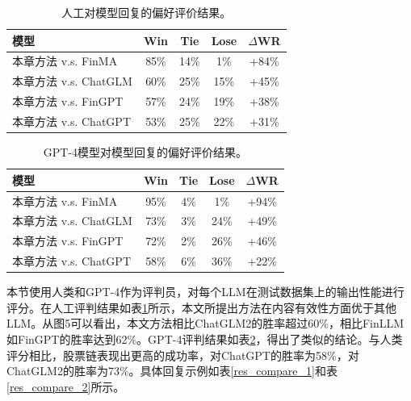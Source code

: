 \begin{table}
	\caption{\label{human_pk_table}人工对模型回复的偏好评价结果。}
	\centering{}%
	\small 
	\begin{tabular}{lcccc}
		\toprule[2pt]
		模型 & Win & Tie & Lose & $\Delta$WR \\
		\hline
		本章方法 v.s. FinMA & 85\% & 14\% & 1\% & +84\% \\
		本章方法 v.s. ChatGLM & 60\% & 25\% & 15\% & +45\% \\
		本章方法 v.s. FinGPT & 57\% & 24\% & 19\% & +38\% \\
		本章方法 v.s. ChatGPT & 53\% & 25\% & 22\% & +31\% \\
		\bottomrule[2pt]
	\end{tabular}
\end{table}

\begin{table}
	\caption{\label{gpt_pk_table}GPT-4模型对模型回复的偏好评价结果。}
	\centering{}%
	\small 
	\begin{tabular}{lcccc}
		\toprule[2pt]
		模型 & Win & Tie & Lose & $\Delta$WR \\
		\hline
		本章方法 v.s. FinMA & 95\% & 4\% & 1\% & +94\% \\
		本章方法 v.s. ChatGLM & 73\% & 3\% & 24\% & +49\% \\
		本章方法 v.s. FinGPT & 72\% & 2\% & 26\% & +46\% \\
		本章方法 v.s. ChatGPT & 58\% & 6\% & 36\% & +22\% \\
		\bottomrule[2pt]
	\end{tabular}
\end{table}

本节使用人类和GPT-4作为评判员，对每个LLM在测试数据集上的输出性能进行评分。在人工评判结果如表\ref{human_pk_table}所示，本文所提出方法在内容有效性方面优于其他LLM。从图5可以看出，本文方法相比ChatGLM2的胜率超过60\%，相比FinLLM如FinGPT的胜率达到62\%。GPT-4评判结果如表\ref{gpt_pk_table}，得出了类似的结论。与人类评分相比，股票链表现出更高的成功率，对ChatGPT的胜率为58\%，对ChatGLM2的胜率为73\%。具体回复示例如表\ref{res_compare_1}和表\ref{res_compare_2}所示。

